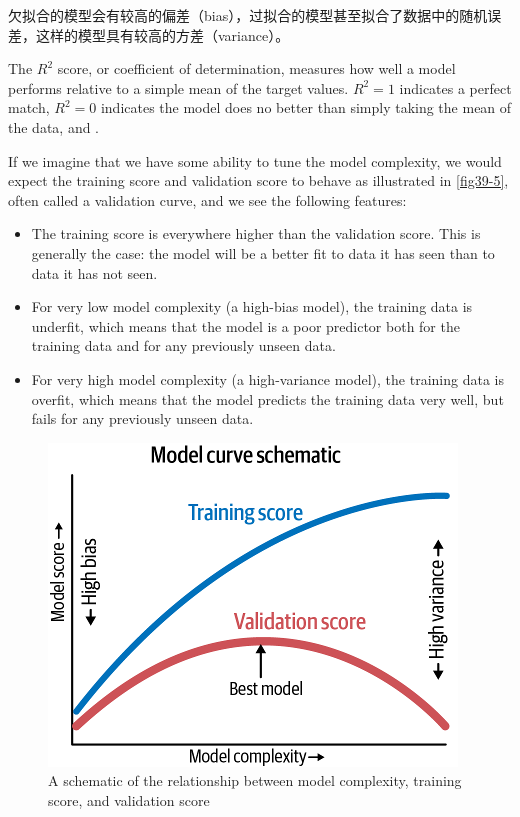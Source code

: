 欠拟合的模型会有较高的偏差（bias），过拟合的模型甚至拟合了数据中的随机误差，这样的模型具有较高的方差（variance）。

The $R^2$ score, or coefficient of determination, measures how
well a model performs relative to a simple mean of the target values. $R^2 = 1$ indicates
a perfect match, $R^2 = 0$ indicates the model does no better than simply taking the
mean of the data, and .

If we imagine that we have some ability to tune the model complexity, we would
expect the training score and validation score to behave as illustrated in \autoref{fig39-5},
often called a validation curve, and we see the following features:
\begin{itemize}
      \item The training score is everywhere higher than the validation score. This is generally the case: the model will be a better fit to data it has seen than to data it has
            not seen.
      \item For very low model complexity (a high-bias model), the training data is underfit,
            which means that the model is a poor predictor both for the training data and for
            any previously unseen data.
      \item For very high model complexity (a high-variance model), the training data is
            overfit, which means that the model predicts the training data very well, but fails
            for any previously unseen data.
\end{itemize}

\begin{figure}
      \centering
      \includegraphics{../Figures/fig39-5.png}
      \caption{A schematic of the relationship between model complexity, training score, and validation score}
      \label{fig39-5}
\end{figure}

